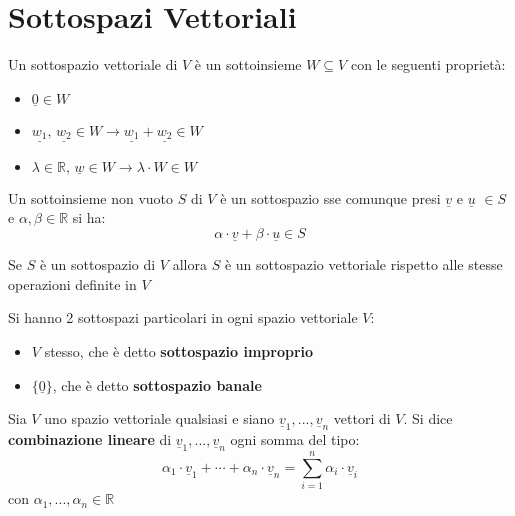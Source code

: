 \documentclass[a4paper,12pt, oneside]{book}
\begin{document}
\section{Sottospazi Vettoriali}
\begin{definizione}
Un sottospazio vettoriale di $V$ è un sottoinsieme $W\subseteq V$ con le seguenti proprietà:
\begin{itemize}
\item $\underline{0}\in W$
\item $\underline{w_1},\,\underline{w_2}\in W\longrightarrow \underline{w_1}+\underline{w_2}\in W$
\item $\lambda\in\mathbb{R},\,\underline{w}\in W \longrightarrow \lambda\cdot W \in W	$
\end{itemize}
\end{definizione}
\begin{teorema}
Un sottoinsieme non vuoto $S$ di $V$ è un sottospazio sse comunque presi $\underline{v}$ e $\underline{u}$ $\in S$ e $\alpha,\beta \in \mathbb{R}$ si ha:
$$\alpha\cdot \underline{v}+\beta\cdot \underline{u}\in S$$
\end{teorema}
\begin{teorema}
Se $S$ è un sottospazio di $V$ allora $S$ è un sottospazio vettoriale rispetto alle stesse operazioni definite in $V$
\end{teorema}
\begin{definizione}
Si hanno 2 sottospazi particolari in ogni spazio vettoriale $V$:
\begin{itemize}
\item $V$ stesso, che è detto \textbf{sottospazio improprio}
\item $\{\underline{0}\}$, che è detto \textbf{sottospazio banale}
\end{itemize}
\end{definizione}
\begin{definizione}
Sia $V$ uno spazio vettoriale qualsiasi e siano $\underline{v}_1,...,\underline{v}_n$ vettori di $V$. Si dice \textbf{combinazione lineare} di $\underline{v}_1,...,\underline{v}_n$ ogni somma del tipo:
$$\alpha_1\cdot \underline{v}_1+\cdots+\alpha_n\cdot \underline{v}_n=\sum_{i=1}^n \alpha_i\cdot \underline{v}_i$$
con $\alpha_1,...,\alpha_n \in \mathbb{R}$
\end{definizione}
\end{document}
